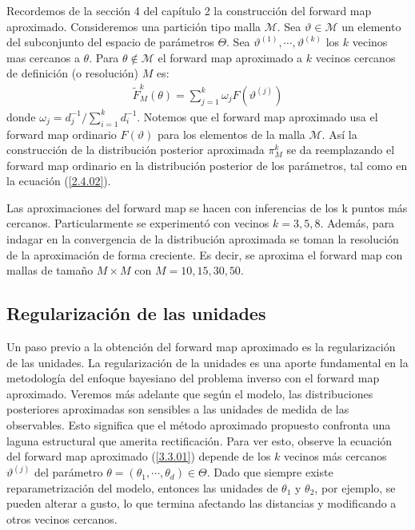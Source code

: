 Recordemos de la sección 4 del capítulo 2 la construcción del forward map aproximado. Consideremos una partición tipo malla $\mathcal{M}$. Sea $\vartheta \in \mathcal{M}$ un elemento del subconjunto del espacio de parámetros $\Theta$. Sea $\vartheta^{(1)},\cdots, \vartheta^{(k)}$ los $k$ vecinos mas cercanos a $\theta$. Para $\theta \notin \mathcal{M}$ el forward map aproximado a $k$ vecinos cercanos de definición (o resolución)  $M$ es:
\begin{align}
    \tilde{F}^{k}_M(\theta) = \sum_{j = 1}^{k} \omega_j F \left(\vartheta^{(j)}\right)
    \label{3.3.01}
\end{align}
donde $\omega_j = d_j^{-1}/ \sum_{i=1}^{k} d_i^{-1}$. Notemos que el forward map aproximado usa el forward map ordinario $F(\vartheta)$ para los elementos de la malla $\mathcal{M}$. Así la construcción de la distribución posterior aproximada $\pi_{M}^{k}$ se da reemplazando el forward map ordinario en la distribución posterior de los parámetros, tal como en la ecuación (\ref{2.4.02}).

Las aproximaciones del forward map se hacen con inferencias de los k puntos más cercanos. Particularmente se experimentó con vecinos $k = 3,5,8$. Además, para indagar en la convergencia de la distribución aproximada se toman la resolución de la aproximación de forma creciente. Es decir, se aproxima el forward map con mallas de tamaño $M \times M$ con $M = 10, 15, 30, 50$.

\subsection*{Regularización de las unidades}

Un paso previo a la obtención del forward map aproximado es la regularización de las unidades. La regularización de la unidades es una aporte fundamental en la metodología del enfoque bayesiano del problema inverso con el forward map aproximado. Veremos más adelante que según el modelo, las distribuciones posteriores aproximadas son sensibles a las unidades de medida de las observables. Esto significa que el método aproximado propuesto confronta una laguna estructural que amerita rectificación. Para ver esto, observe la ecuación del forward map aproximado (\ref{3.3.01}) depende de los $k$ vecinos más cercanos $\vartheta^{(j)}$ del parámetro $\theta =(\theta_1,\cdots,\theta_d)\in \Theta$. Dado que siempre existe reparametrización del modelo, entonces las unidades de $\theta_1$ y $\theta_2$, por ejemplo, se pueden alterar a gusto, lo que termina afectando las distancias y modificando a otros vecinos cercanos. 

